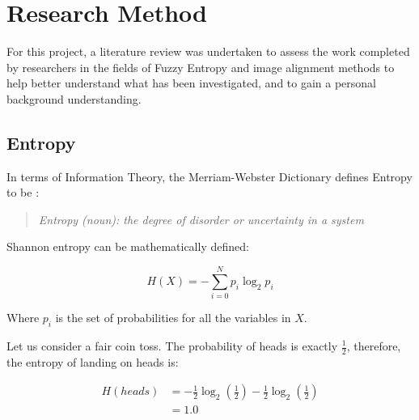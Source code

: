 \section{Research Method}



For this project, a literature review was undertaken to assess the work completed by researchers in the fields of Fuzzy Entropy and image alignment methods to help better understand what has been investigated, and to gain a personal background understanding.

\subsection{Entropy}

In terms of Information Theory, the Merriam-Webster Dictionary defines Entropy to be \cite{def_entropy}:

\begin{quotation}
 \textit{Entropy (noun): the degree of disorder or uncertainty in a system}
\end{quotation}

Shannon entropy can be mathematically defined:

\begin{equation}
  H(X) = - \displaystyle\sum_{i=0}^{N}{p_i \log_2 p_i}
\end{equation}

Where $p_i$ is the set of probabilities for all the variables in $X$.

Let us consider a fair coin toss. The probability of heads is exactly $\frac{1}{2}$, therefore, the entropy of landing on heads is:

\begin{equation}
  \begin{split}
    H(heads) &= -\frac{1}{2}\log_2(\frac{1}{2}) - \frac{1}{2}\log_2(\frac{1}{2}) \\
    &= 1.0
  \end{split}
\end{equation}

